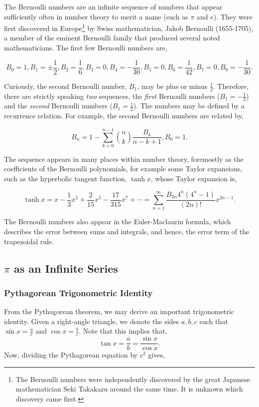 \documentclass[11pt]{amsart}
\begin{document}
The Bernoulli numbers are an infinite sequence of numbers that appear sufficiently often in number theory to merit a name (such as $\pi$ and $e$). They were first discovered in Europe\footnote{The Bernoulli numbers were independently discovered by the great Japanese mathematician Seki Takakazu around the same time. It is unknown which discovery came first.} by Swiss mathematician, Jakob Bernoulli (1655-1705), a member of the eminent Bernoulli family that produced several noted mathematicians. The first few Bernoulli numbers are,

$$B_0 = 1, B_1 = \pm \frac{1}{2}, B_2 = \frac{1}{6}, B_3 = 0, B_4 = -\frac{1}{30}, B_5 = 0, B_6 = \frac{1}{42}, B_7 = 0, B_8 = -\frac{1}{30}.$$

Curiously, the second Bernoulli number, $B_1$, may be plus or minus $\frac{1}{2}$. Therefore, there are strictly speaking \emph{two} sequences, the \emph{first} Bernoulli numbers ($B_1 = -\frac{1}{2}$) and the \emph{second} Bernoulli numbers ($B_1 = \frac{1}{2}$). The numbers may be defined by a recurrence relation. For example, the second Bernoulli numbers are related by,

$$B_n = 1 - \sum_{k=0}^{n-1}{{{n}\choose{k}}}\frac{B_k}{n - k + 1}, B_0 = 1.$$

The sequence appears in many places within number theory, foremostly as the coefficients of the Bernoulli polynomials, for example some Taylor expansions, such as the hyperbolic tangent function, $\tanh x$, whose Taylor expansion is,

$$\tanh x = x - \frac{1}{3}x^3 + \frac{2}{15}x^5 - \frac{17}{315}x^7 + \cdots = \sum_{n=1}^{\infty}\frac{B_{2n}4^n(4^n-1)}{(2n)!}x^{2n-1}.$$

The Bernoulli numbers also appear in the Euler-Maclaurin formula, which describes the error between sums and integrals, and hence, the error term of the trapezoidal rule.

\subsection{$\pi$ as an Infinite Series}

\subsubsection{Pythagorean Trigonometric Identity}

From the Pythagorean theorem, we may derive an important trigonometric identity. Given a right-angle triangle, we denote the sides $a, b, c$ such that $\sin{x} = \frac{a}{c}$ and $\cos{x} = \frac{b}{c}$. Note that this implies that, $$\tan{x} = \frac{a}{b} = \frac{\sin{x}}{\cos{x}}.$$ Now, dividing the Pythagorean equation by $c^2$ gives,
\end{document}
